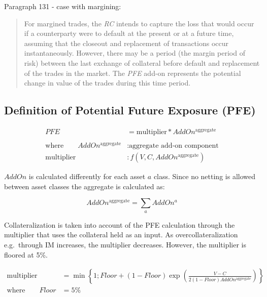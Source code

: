 Paragraph 131 - case with margining:

\begin{quote}
For margined trades, the \emph{RC} intends to capture the loss that
would occur if a counterparty were to default at the present or at a
future time, assuming that the closeout and replacement of transactions
occur instantaneously. However, there may be a period (the margin period
of risk) between the last exchange of collateral before default and
replacement of the trades in the market. The \emph{PFE} add-on
represents the potential change in value of the trades during this time
period.
\end{quote}

    \hypertarget{definition-of-potential-future-exposure-pfe}{%
\subsection{Definition of Potential Future Exposure
(PFE)}\label{definition-of-potential-future-exposure-pfe}}

\begin{align*}
PFE &= \text{multiplier} * AddOn^{\text{aggregate}} \\
\\
\text{where} \qquad AddOn^{\text{aggregate}} &: \text{aggregate add-on component} \\
\text{multiplier} &: f(V,C,AddOn^{\text{aggregate}})
\end{align*}

\(AddOn\) is calculated differently for each asset \(a\) class. Since no
netting is allowed between asset classes the aggregate is calculated as:

\[AddOn^{\text{aggregate}} = \sum_{a}AddOn^{a}\]

Collateralization is taken into account of the PFE calculation through
the multiplier that uses the collateral held as an input. As
overcollateralization e.g.~through IM increases, the multiplier
decreases. However, the multiplier is floored at 5\%.

\begin{align*}
\text{multiplier} &= \min \left\{ 1; Floor + (1-Floor) \exp\left(\frac{V-C}{2(1-Floor)AddOn^{\text{aggregate}}}\right) \right\} \\
\text{where} \qquad Floor &= 5\%
\end{align*}

